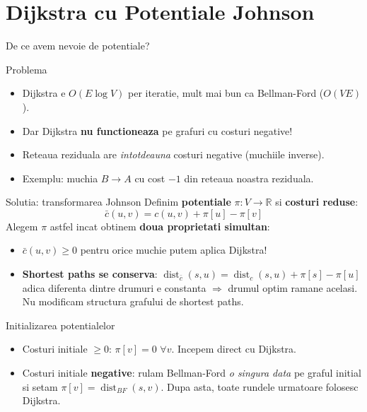 ﻿\documentclass[9pt]{beamer}
\newcommand{\dist}{\operatorname{dist}}
\newcommand{\cbar}{\bar{c}}
\begin{document}
\section{Dijkstra cu Potentiale Johnson}

\begin{frame}[shrink]{De ce avem nevoie de potentiale?}
  \begin{block}{Problema}
    \begin{itemize}
      \item Dijkstra e $O(E\log V)$ per iteratie, mult mai bun ca Bellman-Ford ($O(VE)$).
      \item Dar Dijkstra \textbf{nu functioneaza} pe grafuri cu costuri negative!
      \item Reteaua reziduala are \textit{intotdeauna} costuri negative (muchiile inverse).
      \item Exemplu: muchia $B\to A$ cu cost $-1$ din reteaua noastra reziduala.
    \end{itemize}
  \end{block}
  \begin{alertblock}{Solutia: transformarea Johnson}
    Definim \textbf{potentiale} $\pi:V\to\mathbb{R}$ si \textbf{costuri reduse}:
    \[
      \cbar(u,v) = c(u,v) + \pi[u] - \pi[v]
    \]
    Alegem $\pi$ astfel incat obtinem \textbf{doua proprietati simultan}:
    \begin{itemize}\footnotesize\itemsep1pt
      \item $\cbar(u,v)\geq 0$ pentru orice muchie \textemdash{} putem aplica Dijkstra!
      \item \textbf{Shortest paths se conserva}: $\dist_{\cbar}(s,u) = \dist_c(s,u) + \pi[s] - \pi[u]$\\
            adica diferenta dintre drumuri e constanta $\Rightarrow$ drumul optim ramane acelasi.
            Nu modificam structura grafului de shortest paths.
    \end{itemize}
  \end{alertblock}
  \begin{block}{Initializarea potentialelor}
    \begin{itemize}\footnotesize
      \item Costuri initiale \textbf{$\geq 0$}: $\pi[v]=0$ $\forall v$. Incepem direct cu Dijkstra.
      \item Costuri initiale \textbf{negative}: rulam Bellman-Ford \textit{o singura data}
            pe graful initial si setam $\pi[v]=\dist_{BF}(s,v)$.
            Dupa asta, toate rundele urmatoare folosesc Dijkstra.
    \end{itemize}
  \end{block}
\end{frame}
\end{document}
